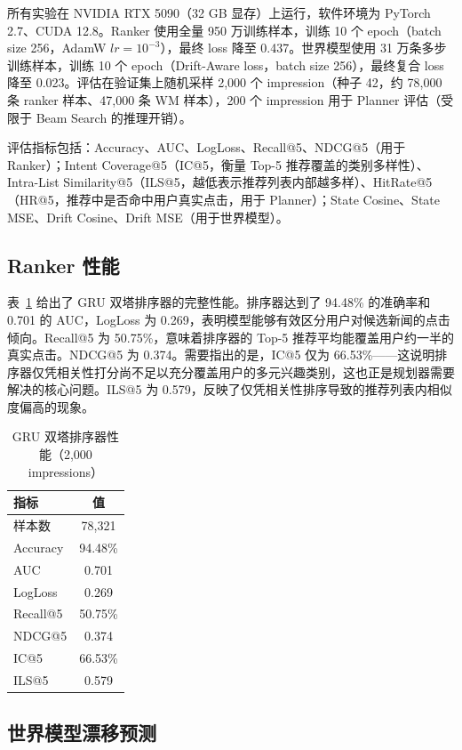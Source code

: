 \documentclass[twocolumn,10pt,a4paper]{ctexart}
\begin{document}
所有实验在 NVIDIA RTX 5090（32 GB 显存）上运行，软件环境为 PyTorch 2.7、CUDA 12.8。Ranker 使用全量 950 万训练样本，训练 10 个 epoch（batch size 256，AdamW $lr=10^{-3}$），最终 loss 降至 0.437。世界模型使用 31 万条多步训练样本，训练 10 个 epoch（Drift-Aware loss，batch size 256），最终复合 loss 降至 0.023。评估在验证集上随机采样 2,000 个 impression（种子 42，约 78,000 条 ranker 样本、47,000 条 WM 样本），200 个 impression 用于 Planner 评估（受限于 Beam Search 的推理开销）。

评估指标包括：Accuracy、AUC、LogLoss、Recall@5、NDCG@5（用于 Ranker）；Intent Coverage@5（IC@5，衡量 Top-5 推荐覆盖的类别多样性）、Intra-List Similarity@5（ILS@5，越低表示推荐列表内部越多样）、HitRate@5（HR@5，推荐中是否命中用户真实点击，用于 Planner）；State Cosine、State MSE、Drift Cosine、Drift MSE（用于世界模型）。

\subsection{Ranker 性能}

表~\ref{tab:ranker} 给出了 GRU 双塔排序器的完整性能。排序器达到了 94.48\% 的准确率和 0.701 的 AUC，LogLoss 为 0.269，表明模型能够有效区分用户对候选新闻的点击倾向。Recall@5 为 50.75\%，意味着排序器的 Top-5 推荐平均能覆盖用户约一半的真实点击。NDCG@5 为 0.374。需要指出的是，IC@5 仅为 66.53\%——这说明排序器仅凭相关性打分尚不足以充分覆盖用户的多元兴趣类别，这也正是规划器需要解决的核心问题。ILS@5 为 0.579，反映了仅凭相关性排序导致的推荐列表内相似度偏高的现象。

\begin{table}[H]
\centering
\caption{GRU 双塔排序器性能（2,000 impressions）}
\label{tab:ranker}
\small
\begin{tabular}{@{}lc@{}}
\toprule
指标 & 值 \\
\midrule
样本数 & 78,321 \\
Accuracy & 94.48\% \\
AUC & 0.701 \\
LogLoss & 0.269 \\
Recall@5 & 50.75\% \\
NDCG@5 & 0.374 \\
IC@5 & 66.53\% \\
ILS@5 & 0.579 \\
\bottomrule
\end{tabular}
\end{table}

\subsection{世界模型漂移预测}
\end{document}
